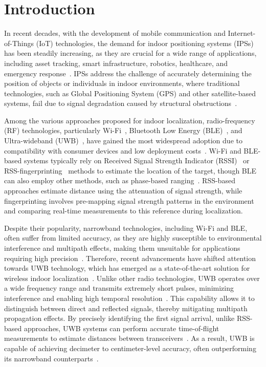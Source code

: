 \chapter{Introduction}

In recent decades, with the development of mobile communication and Internet-of-Things (IoT) technologies, the demand for indoor positioning systems (IPSs) has been steadily increasing, as they are crucial for a wide range of applications, including asset tracking, smart infrastructure, robotics, healthcare, and emergency response~\cite{indoor2022Farahsari}. IPSs address the challenge of accurately determining the position of objects or individuals in indoor environments, where traditional technologies, such as Global Positioning System (GPS) and other satellite-based systems, fail due to signal degradation caused by structural obstructions~\cite{alarifi2016ultra}.

Among the various approaches proposed for indoor localization, radio-frequency (RF) technologies, particularly Wi-Fi~\cite{Abbas2019Wifi}, Bluetooth Low Energy (BLE)~\cite{Jianyong2014BLE_RSSI}, and Ultra-wideband (UWB)~\cite{Simone2021UWB}, have gained the most widespread adoption due to compatibility with consumer devices and low deployment costs~\cite{leitch2023indoor}. Wi-Fi and BLE-based systems typically rely on Received Signal Strength Indicator (RSSI)~\cite{Palumbo2015RSS} or RSS-fingerprinting~\cite{Pelant2017RSSFinger} methods to estimate the location of the target, though BLE can also employ other methods, such as phase-based ranging~\cite{Dyhdalovych2025BLE}. RSS-based approaches estimate distance using the attenuation of signal strength, while fingerprinting involves pre-mapping signal strength patterns in the environment and comparing real-time measurements to this reference during localization.

Despite their popularity, narrowband technologies, including Wi-Fi and BLE, often suffer from limited accuracy, as they are highly susceptible to environmental interference and multipath effects, making them unsuitable for applications requiring high precision~\cite{Yang2021LOC, Zand2019PhaseBLE, Ahmed2024BLE}. Therefore, recent advancements have shifted attention towards UWB technology, which has emerged as a state-of-the-art solution for wireless indoor localization~\cite{Simone2021UWB}. Unlike other radio technologies, UWB operates over a wide frequency range and transmits extremely short pulses, minimizing interference and enabling high temporal resolution~\cite{Che2022UWB}. This capability allows it to distinguish between direct and reflected signals, thereby mitigating multipath propagation effects. By precisely identifying the first signal arrival, unlike RSS-based approaches, UWB systems can perform accurate time-of-flight measurements to estimate distances between transceivers~\cite{Qu_2023}. As a result, UWB is capable of achieving decimeter to centimeter-level accuracy, often outperforming its narrowband counterparts~\cite{Wang2023NLoS, Khan2022UWB}.

